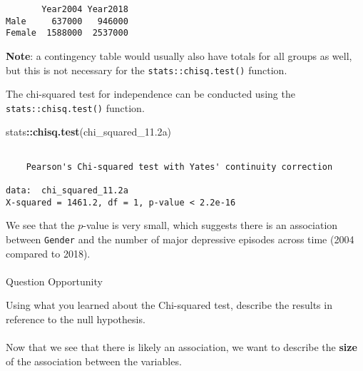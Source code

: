 \documentclass[
]{article}
\newenvironment{Shaded}{\begin{snugshade}}{\end{snugshade}}
\newcommand{\FloatTok}[1]{\textcolor[rgb]{0.00,0.00,0.81}{#1}}
\newcommand{\KeywordTok}[1]{\textcolor[rgb]{0.13,0.29,0.53}{\textbf{#1}}}
\newcommand{\NormalTok}[1]{#1}
\newcommand{\OperatorTok}[1]{\textcolor[rgb]{0.81,0.36,0.00}{\textbf{#1}}}
\begin{document}
\begin{verbatim}
       Year2004 Year2018
Male     637000   946000
Female  1588000  2537000
\end{verbatim}

\textbf{Note}: a contingency table would usually also have totals for
all groups as well, but this is not necessary for the
\texttt{stats::chisq.test()} function.

The chi-squared test for independence can be conducted using the
\texttt{stats::chisq.test()} function.

\begin{Shaded}
\begin{Highlighting}[]
\NormalTok{stats}\OperatorTok{::}\KeywordTok{chisq.test}\NormalTok{(chi_squared_}\FloatTok{11.2}\NormalTok{a)}
\end{Highlighting}
\end{Shaded}

\begin{verbatim}

    Pearson's Chi-squared test with Yates' continuity correction

data:  chi_squared_11.2a
X-squared = 1461.2, df = 1, p-value < 2.2e-16
\end{verbatim}

We see that the \(p\)-value is very small, which suggests there is an
association between \texttt{Gender} and the number of major depressive
episodes across time (2004 compared to 2018).

\hypertarget{section-44}{%
\paragraph{}\label{section-44}}

Question Opportunity

Using what you learned about the Chi-squared test, describe the results
in reference to the null hypothesis.

\hypertarget{section-45}{%
\paragraph{}\label{section-45}}

Now that we see that there is likely an association, we want to describe
the \textbf{size} of the association between the variables.
\end{document}
